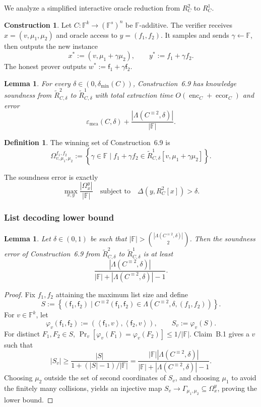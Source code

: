 \documentclass[11pt]{article}
\theoremstyle{plain}
\newtheorem{lemma}[theorem]{Lemma}
\theoremstyle{definition}
\newtheorem{definition}[theorem]{Definition}
\newtheorem{construction}[theorem]{Construction}
\newcommand{\F}{\mathbb{F}}
\newcommand{\epsmca}{\varepsilon_{\mathrm{mca}}}
\newcommand{\distmin}{\delta_{\min}}
\newcommand{\set}[1]{\left\{#1\right\}}
\newcommand{\angles}[1]{\left\langle #1\right\rangle}
\newcommand{\abs}[1]{\left|#1\right|}
\DeclareMathOperator{\enc}{enc}
\DeclareMathOperator{\ecor}{ecor}
\DeclareMathOperator*{\Prb}{Pr}
\begin{document}
We analyze a simplified interactive oracle reduction from $R_C^2$ to $R_C^1$.

\begin{construction}
Let $C:\F^k\to(\F^s)^n$ be $\F$-additive. The verifier receives $x=(v,\mu_1,\mu_2)$ and oracle access to $y=(f_1,f_2)$. It samples and sends $\gamma\leftarrow\F$, then outputs the new instance
\[
  x^*:=(v,\mu_1+\gamma\mu_2),\qquad y^*:=f_1+\gamma f_2.
\]
The honest prover outputs $w^*:=\mathsf{f}_1+\gamma\mathsf{f}_2$.
\end{construction}

\begin{lemma}
For every $\delta\in(0,\distmin(C))$, Construction~6.9 has knowledge soundness from $\widetilde R_{C,\delta}^2$ to $\widetilde R_{C,\delta}^1$ with total extraction time $O(\enc_C+\ecor_C)$ and error
\[
  \epsmca(C,\delta)+\frac{\abs{\Lambda(C^{\equiv2},\delta)}}{\abs{\F}}.
\]
\end{lemma}

\begin{definition}
The winning set of Construction~6.9 is
\[
  \Omega^{f_1,f_2}_{v,\mu_1,\mu_2}:=
  \set{\gamma\in\F\mid f_1+\gamma f_2\in \widetilde R_{C,\delta}^1[v,\mu_1+\gamma\mu_2]}.
\]
\end{definition}

The soundness error is exactly
\[
  \max_{x,y}\frac{\abs{\Omega_x^y}}{\abs{\F}}
  \quad\text{subject to}\quad
  \Delta(y,R_C^2[x])>\delta.
\]

\subsubsection{List decoding lower bound}

\begin{lemma}
Let $\delta\in(0,1)$ be such that $\abs{\F}>\binom{\abs{\Lambda(C^{\equiv2},\delta)}}{2}$. Then the soundness error of Construction~6.9 from $\widetilde R_{C,\delta}^2$ to $\widetilde R_{C,\delta}^1$ is at least
\[
  \frac{\abs{\Lambda(C^{\equiv2},\delta)}}{\abs{\F}+\abs{\Lambda(C^{\equiv2},\delta)}-1}.
\]
\end{lemma}

\begin{proof}
Fix $f_1,f_2$ attaining the maximum list size and define
\[
S:=\set{(\mathsf{f}_1,\mathsf{f}_2)\mid
C^{\equiv2}(\mathsf{f}_1,\mathsf{f}_2)\in\Lambda(C^{\equiv2},\delta,(f_1,f_2))}.
\]
For $v\in\F^k$, let
\[
  \varphi_v(\mathsf{f}_1,\mathsf{f}_2):=(\angles{\mathsf{f}_1,v},\angles{\mathsf{f}_2,v}),
  \qquad S_v:=\varphi_v(S).
\]
For distinct $F_1,F_2\in S$, $\Prb_v[\varphi_v(F_1)=\varphi_v(F_2)]\le1/\abs{\F}$. Claim~B.1 gives a $v$ such that
\[
  \abs{S_v}\ge \frac{\abs{S}}{1+(\abs{S}-1)/\abs{\F}}
  =\frac{\abs{\F}\abs{\Lambda(C^{\equiv2},\delta)}}{\abs{\F}+\abs{\Lambda(C^{\equiv2},\delta)}-1}.
\]
Choosing $\mu_2$ outside the set of second coordinates of $S_v$, and choosing $\mu_1$ to avoid the finitely many collisions, yields an injective map $S_v\to\Gamma_{\mu_1,
\mu_2}\subseteq\Omega_x^y$, proving the lower bound.
\end{proof}
\end{document}
